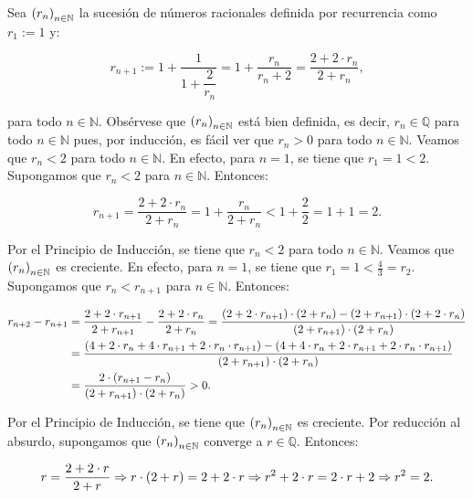 Sea $\left(r_n\right)_{n\in\mathbb{N}}$ la sucesión de números racionales definida por recurrencia como $r_1:=1$ y:

\begin{equation}
  r_{n+1}:=1+\frac{1}{1+\dfrac{2}{r_n}}=1+\frac{r_n}{r_n+2}=\frac{2+2\cdot r_n}{2+r_n},
\end{equation}

para todo $n\in\mathbb{N}$. Obsérvese que $\left(r_n\right)_{n\in\mathbb{N}}$ está bien definida, es decir, $r_n\in\mathbb{Q}$ para todo $n\in\mathbb{N}$ pues, por inducción, es fácil ver que $r_n>0$ para todo $n\in\mathbb{N}$. Veamos que $r_n<2$ para todo $n\in\mathbb{N}$. En efecto, para $n=1$, se tiene que $r_1=1<2$. Supongamos que $r_n<2$ para $n\in\mathbb{N}$. Entonces:

\begin{equation}
  r_{n+1}=\frac{2+2\cdot r_n}{2+r_n}=1+\frac{r_n}{2+r_n}<1+\frac{2}{2}=1+1=2.
\end{equation}

Por el Principio de Inducción, se tiene que $r_n<2$ para todo $n\in\mathbb{N}$. Veamos que $\left(r_n\right)_{n\in\mathbb{N}}$ es creciente. En efecto, para $n=1$, se tiene que $r_1=1<\frac{4}{3}=r_2$. Supongamos que $r_n<r_{n+1}$ para $n\in\mathbb{N}$. Entonces:

\begin{equation}
  \begin{split}
    r_{n+2}-r_{n+1} & =\frac{2+2\cdot r_{n+1}}{2+r_{n+1}}-\frac{2+2\cdot r_n}{2+r_n}=\frac{\left(2+2\cdot r_{n+1}\right)\cdot\left(2+r_n\right)-\left(2+r_{n+1}\right)\cdot\left(2+2\cdot r_n\right)}{\left(2+r_{n+1}\right)\cdot\left(2+r_n\right)}\\
    &=\frac{\left(4+2\cdot r_n+4\cdot r_{n+1}+2\cdot r_n\cdot r_{n+1}\right)-\left(4+4\cdot r_n+2\cdot r_{n+1}+2\cdot r_n\cdot r_{n+1}\right)}{\left(2+r_{n+1}\right)\cdot\left(2+r_n\right)}\\
    &=\frac{2\cdot \left(r_{n+1}-r_n\right)}{\left(2+r_{n+1}\right)\cdot\left(2+r_n\right)}>0.
  \end{split}
\end{equation}

Por el Principio de Inducción, se tiene que $\left(r_n\right)_{n\in\mathbb{N}}$ es creciente. Por reducción al absurdo, supongamos que $\left(r_n\right)_{n\in\mathbb{N}}$ converge a $r\in\mathbb{Q}$. Entonces:

\begin{equation}
  r=\frac{2+2\cdot r}{2+r}\Rightarrow r\cdot\left(2+r\right)=2+2\cdot r\Rightarrow r^2+2\cdot r=2\cdot r+2\Rightarrow r^2=2.
\end{equation}


